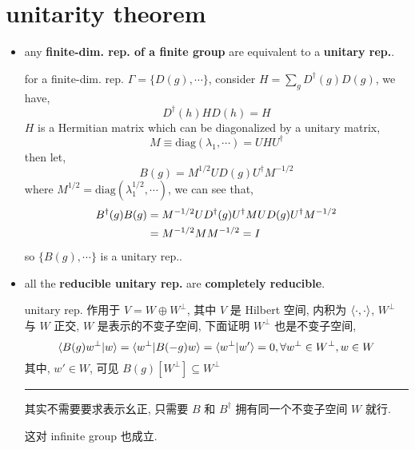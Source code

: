 \section{unitarity theorem} \label{1.2}
\begin{itemize}
	\item any \textbf{finite-dim. rep. of a finite group} are equivalent to a \textbf{unitary rep.}.
	
	\begin{tcolorbox}[title=proof:]
		for a finite-dim. rep. $\Gamma = \{D(g), \cdots\}$, consider $H = \sum_g D^\dagger(g) D(g)$, we have,
		\begin{equation}
			D^\dagger(h) H D(h) = H
		\end{equation}
		$H$ is a Hermitian matrix which can be diagonalized by a unitary matrix,
		\begin{equation}
			M \equiv \mathrm{diag}(\lambda_1, \cdots) = U H U^\dagger
		\end{equation}
		then let,
		\begin{equation}
			B(g) = M^{1 / 2} U D(g) U^\dagger M^{- 1 / 2}
		\end{equation}
		where $M^{1 / 2} = \mathrm{diag}(\lambda_1^{1 / 2}, \cdots)$, we can see that,
		\begin{align}
			B^\dagger(g) B(g) &= M^{- 1 / 2} U D^\dagger(g) U^\dagger M U D(g) U^\dagger M^{- 1 / 2} \notag \\
			&= M^{- 1 / 2} M M^{- 1 / 2} = I
		\end{align}
		so $\{B(g), \cdots\}$ is a unitary rep..
	\end{tcolorbox}
	
	\item all the \textbf{reducible unitary rep.} are \textbf{completely reducible}.
	
	\begin{tcolorbox}[title=proof:]
		unitary rep. 作用于 $V = W \oplus W^\perp$, 其中 $V$ 是 Hilbert 空间, 内积为 $\braket{\cdot, \cdot}$, $W^\perp$ 与 $W$ 正交, $W$ 是表示的不变子空间, 下面证明 $W^\perp$ 也是不变子空间,
		\begin{equation}
			\braket{B(g) w^\perp | w} = \braket{w^\perp | B(- g) w} = \braket{w^\perp | w'} = 0, \forall w^\perp \in W^\perp, w \in W
		\end{equation}
		其中, $w' \in W$, 可见 $B(g)[W^\perp] \subseteq W^\perp$
		
		\noindent\rule[0.5ex]{\linewidth}{0.5pt} %
		
		其实不需要要求表示幺正, 只需要 $B$ 和 $B^\dag$ 拥有同一个不变子空间 $W$ 就行.
	\end{tcolorbox}
	
	这对 infinite group 也成立.
\end{itemize}

